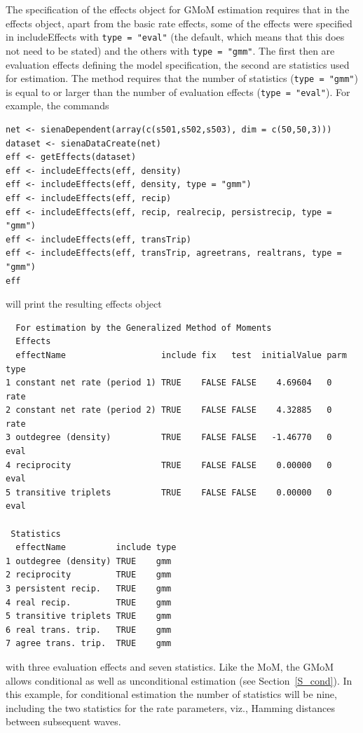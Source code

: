 \documentclass[a4paper,fleqn,11pt]{article}
\newcommand{\+}{\, + \,}
\newcommand{\sfn}[1]{\textsf{#1}}
\begin{document}

The specification of the effects object for GMoM estimation requires
that in the effects object, apart from the basic rate effects,
some of the effects were specified
in  \sfn{includeEffects} with \texttt{type = "eval"}
(the default, which means that this does not need to be stated)
and the others with \texttt{type = "gmm"}.
The first then are evaluation effects defining the model specification,
the second are statistics used for estimation.
The method requires that the number of statistics (\texttt{type = "gmm"})
is equal to or larger than the number of
evaluation effects (\texttt{type = "eval"}).
For example, the commands

\begin{verbatim}
net <- sienaDependent(array(c(s501,s502,s503), dim = c(50,50,3)))
dataset <- sienaDataCreate(net)
eff <- getEffects(dataset)
eff <- includeEffects(eff, density)
eff <- includeEffects(eff, density, type = "gmm")
eff <- includeEffects(eff, recip)
eff <- includeEffects(eff, recip, realrecip, persistrecip, type = "gmm")
eff <- includeEffects(eff, transTrip)
eff <- includeEffects(eff, transTrip, agreetrans, realtrans, type = "gmm")
eff
\end{verbatim}
will print the resulting effects object
\begin{verbatim}
  For estimation by the Generalized Method of Moments
  Effects
  effectName                   include fix   test  initialValue parm type
1 constant net rate (period 1) TRUE    FALSE FALSE    4.69604   0    rate
2 constant net rate (period 2) TRUE    FALSE FALSE    4.32885   0    rate
3 outdegree (density)          TRUE    FALSE FALSE   -1.46770   0    eval
4 reciprocity                  TRUE    FALSE FALSE    0.00000   0    eval
5 transitive triplets          TRUE    FALSE FALSE    0.00000   0    eval

 Statistics
  effectName          include type
1 outdegree (density) TRUE    gmm
2 reciprocity         TRUE    gmm
3 persistent recip.   TRUE    gmm
4 real recip.         TRUE    gmm
5 transitive triplets TRUE    gmm
6 real trans. trip.   TRUE    gmm
7 agree trans. trip.  TRUE    gmm
\end{verbatim}
with three evaluation effects and seven statistics.
Like the MoM, the GMoM allows conditional as well as unconditional
estimation (see Section~\ref{S_cond}).
In this example, for conditional estimation the number
of statistics will be nine, including the two statistics
for the rate parameters, viz., Hamming distances
between subsequent waves.
\end{document}
